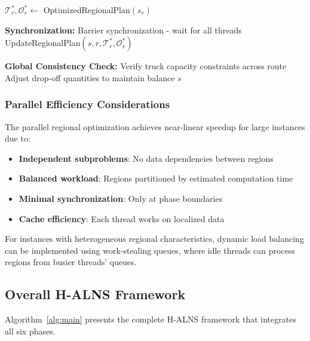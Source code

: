 \begin{algorithm}[htbp]
\begin{algorithmic}[1]
        \State $\mathcal{T}^*_r, \mathcal{O}^*_r \leftarrow$ OptimizedRegionalPlan$(s_r)$
        \EndParFor

        \State \textbf{Synchronization:}
        \State Barrier synchronization - wait for all threads
        \State UpdateRegionalPlan$(s, r, \mathcal{T}^*_r, \mathcal{O}^*_r)$
        \EndFor

        \State \textbf{Global Consistency Check:}
        \State Verify truck capacity constraints across route
        \State Adjust drop-off quantities to maintain balance
        \State \Return $s$
    \end{algorithmic}
\end{algorithm}

\subsubsection{Parallel Efficiency Considerations}

The parallel regional optimization achieves near-linear speedup for large instances due to:
\begin{itemize}
    \item \textbf{Independent subproblems}: No data dependencies between regions
    \item \textbf{Balanced workload}: Regions partitioned by estimated computation time
    \item \textbf{Minimal synchronization}: Only at phase boundaries
    \item \textbf{Cache efficiency}: Each thread works on localized data
\end{itemize}

For instances with heterogeneous regional characteristics, dynamic load balancing can be implemented using work-stealing queues, where idle threads can process regions from busier threads' queues.

\subsection{Overall H-ALNS Framework}

Algorithm~\ref{alg:main} presents the complete H-ALNS framework that integrates all six phases.

